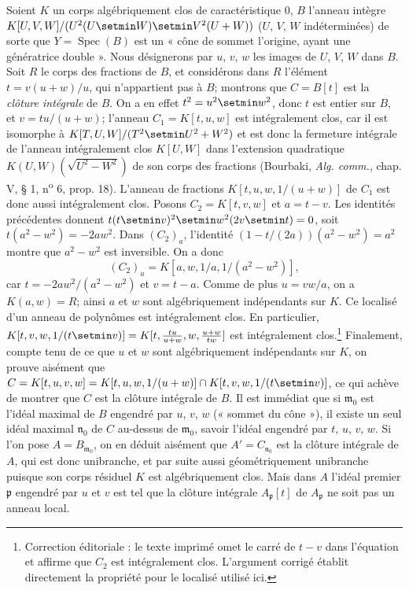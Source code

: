 Soient $K$ un corps algébriquement clos de caractéristique 0, $B$ l'anneau
intègre $K[U,V,W]/(U^2(U\setmin W)\setmin V^2(U+W))$
($U$, $V$, $W$ indéterminées) de sorte que $Y=\operatorname{Spec}(B)$ est
un « cône de sommet l'origine, ayant une génératrice double ». Nous
désignerons par $u$, $v$, $w$ les images de $U$, $V$, $W$ dans $B$. Soit
$R$ le corps des fractions de $B$, et considérons dans $R$ l'élément
$t=v(u+w)/u$, qui n'appartient pas à $B$; montrons que $C=B[t]$ est la
\emph{clôture intégrale} de $B$. On a en effet $t^2=u^2\setmin w^2$, donc $t$ est entier
sur $B$, et $v=tu/(u+w)$; l'anneau $C_1=K[t,u,w]$ est intégralement clos,
car il est isomorphe à
$K[T,U,W]/(T^2\setmin U^2+W^2)$ et est donc la fermeture intégrale de l'anneau
intégralement clos $K[U,W]$ dans l'extension quadratique
$K(U,W)(\sqrt{U^2-W^2})$ de son corps des fractions (Bourbaki, \emph{Alg. comm.},
chap. V, § 1, n\textsuperscript{o} 6, prop. 18). L'anneau de fractions
$K[t,u,w,1/(u+w)]$ de $C_1$ est donc aussi intégralement clos. Posons $C_2=K[t,v,w]$ et $a=t-v$. Les identités précédentes donnent
$t(t\setmin v)^2\setmin w^2(2v\setmin t)=0$, soit $t(a^2-w^2)=-2aw^2$.
Dans $(C_2)_a$, l'identité $(1-t/(2a))(a^2-w^2)=a^2$ montre que
$a^2-w^2$ est inversible. On a donc
\[
(C_2)_a=K[a,w,1/a,1/(a^2-w^2)],
\]
car $t=-2aw^2/(a^2-w^2)$ et $v=t-a$. Comme de plus $u=vw/a$,
on a $K(a,w)=R$; ainsi $a$ et $w$ sont algébriquement indépendants sur $K$.
Ce localisé d'un anneau de polynômes est intégralement clos. En particulier,
$K[t,v,w,1/(t\setmin v)]=K[t,\frac{tu}{u+w},w,\frac{u+w}{tw}]$ est intégralement clos.\footnote{Correction éditoriale : le texte imprimé omet le carré de $t-v$ dans l'équation et affirme que $C_2$ est intégralement clos. L'argument corrigé établit directement la propriété pour le localisé utilisé ici.}
Finalement, compte tenu de ce
que $u$ et $w$ sont algébriquement indépendants sur $K$, on prouve aisément
que $C=K[t,u,v,w]=K[t,u,w,1/(u+w)]\cap K[t,v,w,1/(t\setmin v)]$,
ce qui achève de montrer que $C$ est la clôture intégrale de $B$. Il est
immédiat que si $\mathfrak m_0$ est l'idéal maximal de $B$ engendré par
$u$, $v$, $w$ (« sommet du cône »), il existe un seul idéal maximal
$\mathfrak n_0$ de $C$ au-dessus de $\mathfrak m_0$, savoir l'idéal
engendré par $t$, $u$, $v$, $w$. Si l'on pose $A=B_{\mathfrak m_0}$, on en
déduit aisément que $A'=C_{\mathfrak n_0}$ est la clôture intégrale de
$A$, qui est donc unibranche, et par suite aussi géométriquement unibranche
puisque son corps résiduel $K$ est algébriquement clos. Mais dans $A$
l'idéal premier $\mathfrak p$ engendré par $u$ et $v$ est tel que la
clôture intégrale $A_\mathfrak p[t]$ de $A_\mathfrak p$ ne soit pas un
anneau local.

